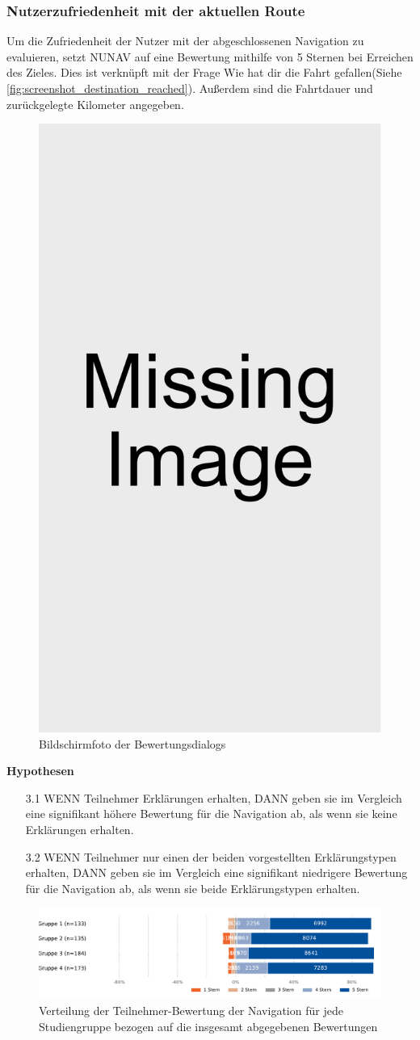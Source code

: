 \subsubsection{Nutzerzufriedenheit mit der aktuellen Route}

Um die Zufriedenheit der Nutzer mit der abgeschlossenen Navigation zu evaluieren, setzt NUNAV auf eine Bewertung mithilfe von 5 Sternen bei Erreichen des Zieles. Dies ist verknüpft mit der Frage \glqq Wie hat dir die Fahrt gefallen\grqq (Siehe \autoref{fig:screenshot_destination_reached}). Außerdem sind die Fahrtdauer und zurückgelegte Kilometer angegeben.

\begin{figure}
    \includegraphics[width=0.25\linewidth]{contents/res/missing_image.pdf}
    \caption{Bildschirmfoto der Bewertungsdialogs}
    \label{fig:screenshot_destination_reached}
\end{figure}

\textbf{Hypothesen}

\begin{enumerate}
    \item[3.1] WENN Teilnehmer Erklärungen erhalten, DANN geben sie im Vergleich eine signifikant höhere Bewertung für die Navigation ab, als wenn sie keine Erklärungen erhalten.
    \item[3.2] WENN Teilnehmer nur einen der beiden vorgestellten Erklärungstypen erhalten, DANN geben sie im Vergleich eine signifikant niedrigere Bewertung für die Navigation ab, als wenn sie beide Erklärungstypen erhalten.
\end{enumerate}

\begin{figure}
    \includegraphics[width=\linewidth]{contents/06_model_evaluation/res/Rating_Result_Overview.pdf}
    \caption{Verteilung der Teilnehmer-Bewertung der Navigation für jede Studiengruppe bezogen auf die insgesamt abgegebenen Bewertungen}
    \label{fig:Rating_Result_Overview}
\end{figure}

